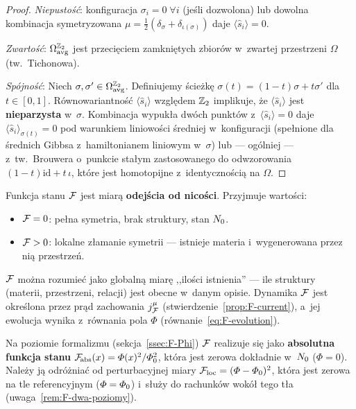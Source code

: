 \begin{proof}
\emph{Niepusto\'s\'c}: konfiguracja $\sigma_i = 0\;\forall i$
(je\'sli dozwolona) lub dowolna kombinacja symetryzowana
$\mu = \frac{1}{2}(\delta_\sigma + \delta_{\iota(\sigma)})$
daje $\langle\hat{s}_i\rangle = 0$.

\emph{Zwarto\'s\'c}: $\Omega^{\mathbb{Z}_2}_{\mathrm{avg}}$ jest
przeci\k{e}ciem zamkni\k{e}tych zbior\'ow w~zwartej
przestrzeni $\Omega$ (tw.~Tichonowa).

\emph{Sp\'ojno\'s\'c}: Niech $\sigma, \sigma' \in
\Omega^{\mathbb{Z}_2}_{\mathrm{avg}}$. Definiujemy \'scie\.zk\k{e}
$\sigma(t) = (1-t)\sigma + t\sigma'$ dla $t\in[0,1]$.
R\'ownowariantno\'s\'c $\langle\hat{s}_i\rangle$ wzgl\k{e}dem
$\mathbb{Z}_2$ implikuje, \.ze $\langle\hat{s}_i\rangle$ jest
\textbf{nieparzysta} w~$\sigma$. Kombinacja wypuk\l{}a dw\'och
punkt\'ow z~$\langle\hat{s}_i\rangle = 0$ daje
$\langle\hat{s}_i\rangle_{\sigma(t)} = 0$ pod warunkiem
liniowo\'sci \'sredniej w~konfiguracji (spe\l{}nione
dla \'srednich Gibbsa z~hamiltonianem liniowym w~$\sigma$)
lub --- og\'olniej --- z~tw.~Brouwera o~punkcie sta\l{}ym
zastosowanego do odwzorowania $(1-t)\mathrm{id} + t\,\iota$,
kt\'ore jest homotopijne z~identyczno\'sci\k{a} na $\Omega$.
\end{proof}

\begin{definition}\label{def:F}
Funkcja stanu $\mathcal{F}$ jest miar\k{a} \textbf{odej\'scia od nico\'sci}.
Przyjmuje warto\'sci:
\begin{itemize}[nosep]
  \item $\mathcal{F} = 0$: pe\l{}na symetria, brak struktury, stan $N_0$.
  \item $\mathcal{F} > 0$: lokalne z\l{}amanie symetrii --- istnieje materia
        i~wygenerowana przez ni\k{a} przestrze\'n.
\end{itemize}
$\mathcal{F}$ mo\.zna rozumie\'c jako globaln\k{a} miar\k{e} ,,ilo\'sci
istnienia'' --- ile struktury (materii, przestrzeni, relacji)
jest obecne w~danym opisie. Dynamika $\mathcal{F}$ jest okre\'slona
przez pr\k{a}d zachowania $j_{\mathcal{F}}^\mu$
(stwierdzenie~\ref{prop:F-current}), a~jej ewolucja wynika
z~r\'ownania pola $\Phi$ (r\'ownanie~\ref{eq:F-evolution}).

Na poziomie formalizmu (sekcja~\ref{ssec:F-Phi}) $\mathcal{F}$ realizuje
si\k{e} jako \textbf{absolutna funkcja stanu}
$\mathcal{F}_{\!\mathrm{abs}}(x) = \varPhi(x)^2/\varPhi_0^2$,
kt\'ora jest zerowa dok\l{}adnie w~$N_0$ ($\Phi = 0$).
Nale\.zy j\k{a} odr\'o\.znia\'c od perturbacyjnej miary
$\mathcal{F}_{\mathrm{loc}} = (\varPhi - \varPhi_0)^2$, kt\'ora jest zerowa
na tle referencyjnym ($\varPhi = \varPhi_0$) i~s\l{}u\.zy
do rachunk\'ow wok\'o\l{} tego t\l{}a
(uwaga~\ref{rem:F-dwa-poziomy}).
\end{definition}

